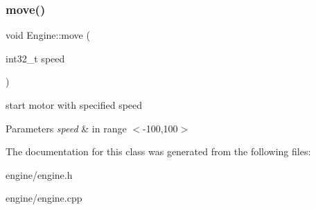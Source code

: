 \subsubsection{\texorpdfstring{move()}{move()}}
{\footnotesize\ttfamily void Engine\+::move (\begin{DoxyParamCaption}\item[{int32\+\_\+t}]{speed }\end{DoxyParamCaption})}



start motor with specified speed 


\begin{DoxyParams}{Parameters}
{\em speed} & in range $<$-\/100,100$>$ \\
\hline
\end{DoxyParams}


The documentation for this class was generated from the following files\+:\begin{DoxyCompactItemize}
\item 
engine/engine.\+h\item 
engine/engine.\+cpp\end{DoxyCompactItemize}
